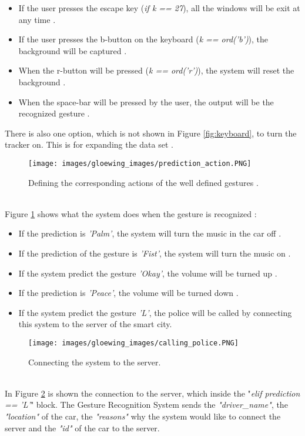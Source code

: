 \begin{itemize}
    \item If the user presses the escape key (\textit{if k == 27}), all the windows will be exit at any time \cite{Brenner2018}.
    \item If the user presses the b-button on the keyboard (\textit{k == ord('b')}), the background will be captured \cite{Brenner2018}.
    \item When the r-button will be pressed (\textit{k == ord('r')}), the system will reset the background \cite{Brenner2018}.
    \item When the space-bar will be pressed by the user, the output will be the recognized gesture \cite{Brenner2018}.
\end{itemize}
There is also one option, which is not shown in Figure \ref{fig:keyboard}, to turn the tracker on. This is for expanding the data set \cite{Brenner2018}.
\begin{figure}
\sidecaption
\texttt{[image: images/gloewing\_images/prediction\_action.PNG]}
\caption{Defining the corresponding actions of the well defined gestures \cite{Brenner2018}.}
\label{fig:predict_action}
\end{figure}\\
Figure \ref{fig:predict_action} shows what the system does when the gesture is recognized \cite{Brenner2018}:
\begin{itemize}
    \item If the prediction is \textit{'Palm'}, the system will turn the music in the car off \cite{Brenner2018}.
    \item If the prediction of the gesture is \textit{'Fist'}, the system will turn the music on \cite{Brenner2018}.
    \item If the system predict the gesture \textit{'Okay'}, the volume will be turned up \cite{Brenner2018}.
    \item If the prediction is \textit{'Peace'}, the volume will be turned down \cite{Brenner2018}.
    \item If the system predict the gesture \textit{'L'}, the police will be called by connecting this system to the server of the smart city.
\end{itemize}
\begin{figure}
\sidecaption
\texttt{[image: images/gloewing\_images/calling\_police.PNG]}
\caption{Connecting the system to the server.}
\label{fig:calling_police}
\end{figure}\\
In Figure \ref{fig:calling_police} is shown the connection to the server, which inside the "\textit{elif prediction == 'L'}" block. The Gesture Recognition System sends the \textit{"driver\_name"}, the \textit{"location"} of the car, the \textit{"reasons"} why the system would like to connect the server and the \textit{"id"} of the car to the server.\\



